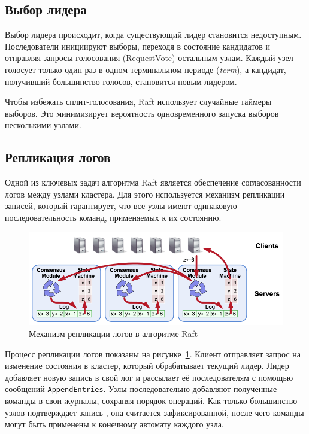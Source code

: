 \subsection{Выбор лидера}

Выбор лидера происходит, когда существующий лидер становится недоступным. Последователи
инициируют выборы, переходя в состояние кандидатов и отправляя запросы голосования
(RequestVote) остальным узлам. Каждый узел голосует только один раз в одном терминальном
периоде (\textit{term}), а кандидат, получивший большинство голосов, становится новым
лидером.  

Чтобы избежать сплит-голоcования, Raft использует случайные таймеры выборов. Это
минимизирует вероятность одновременного запуска выборов несколькими узлами.

\subsection{Репликация логов}

Одной из ключевых задач алгоритма Raft является обеспечение согласованности логов между
узлами кластера. Для этого используется механизм репликации записей, который гарантирует,
что все узлы имеют одинаковую последовательность команд, применяемых к их состоянию.

\begin{figure}
  \centering
  \includegraphics[scale=0.6]{assets/raft_replication.png}
  \caption{Механизм репликации логов в алгоритме Raft \cite{raft_rs}}
  \label{fig:raft-replication}
\end{figure}

Процесс репликации логов показаны на рисунке~\ref{fig:raft-replication}. Клиент
отправляет запрос на изменение состояния в кластер, который обрабатывает текущий лидер.
Лидер добавляет новую запись в свой лог и рассылает её последователям с помощью
сообщений \texttt{AppendEntries}. Узлы последовательно добавляют полученные команды в
свои журналы, сохраняя порядок операций. Как только большинство узлов подтверждает запись
, она считается зафиксированной, после чего команды могут быть применены к конечному
автомату каждого узла.

